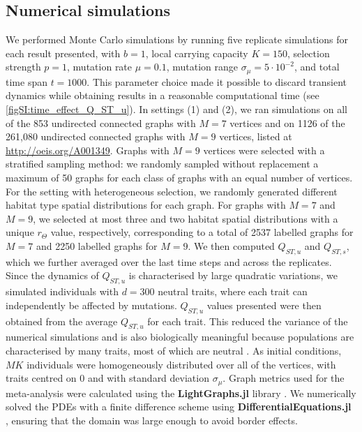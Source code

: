   \subsection{Numerical simulations}
  We performed Monte Carlo simulations by running five replicate simulations for each result presented, with $b = 1$, local carrying capacity $K = 150$, selection strength $p = 1$, mutation rate $\mu=0.1$, mutation range $\sigma_\mu = 5 \cdot 10^{-2}$, and total time span $t = 1000$. This parameter choice made it possible to discard transient dynamics while obtaining results in a reasonable computational time (see \cref{figSI:time_effect_Q_ST_u}).
  In settings (1) and (2), we ran simulations on all of the 853 undirected connected graphs with $M=7$ vertices and on 1126 of the 261,080 undirected connected graphs with $M=9$ vertices, listed at \href{http://oeis.org/A001349}{http://oeis.org/A001349}. Graphs with $M = 9$ vertices were selected with a stratified sampling method: we randomly sampled without replacement a maximum of 50 graphs for each class of graphs with an equal number of vertices. For the setting with heterogeneous selection, we randomly generated different habitat type spatial distributions for each graph. For graphs with $M=7$ and $M=9$, we selected at most three and two habitat spatial distributions with a unique $r_\Theta$ value, respectively, corresponding to a total of 2537 labelled graphs for $M=7$ and 2250 labelled graphs for $M=9$.
  We then computed $Q_{ST,u}$ and $Q_{ST,s}$, which we further averaged over the last time steps and across the replicates.
  Since the dynamics of $Q_{ST,u}$ is characterised by large quadratic variations, we simulated individuals with $d = 300$ neutral traits, where each trait can independently be affected by mutations. $Q_{ST,u}$ values presented were then obtained from the average $Q_{ST,u}$ for each trait. This reduced the variance of the numerical simulations and is also biologically meaningful because populations are characterised by many traits, most of which are neutral \cite{Holderegger2006}.
  As initial conditions, $MK$ individuals were homogeneously distributed over all of the vertices, with traits centred on 0 and with standard deviation $\sigma_\mu$.
  Graph metrics used for the meta-analysis were calculated using the \textbf{LightGraphs.jl} library \cite{Bromberger2017}. We numerically solved the PDEs with a finite difference scheme using \textbf{DifferentialEquations.jl} \cite{Rackauckas2017}, ensuring that the domain was large enough to avoid border effects.
  
